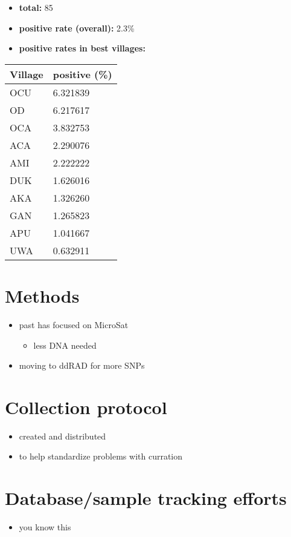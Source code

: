\documentclass[letterpaper]{scrartcl}
\begin{document}
\begin{itemize}
\itemsep1pt\parskip0pt
\item
  \textbf{total:} 85
\item
  \textbf{positive rate (overall):} 2.3\%
\item
  \textbf{positive rates in best villages:}
\end{itemize}

\begin{longtable}[c]{@{}ll@{}}
\toprule
Village & positive (\%)\tabularnewline
\midrule
\endhead
OCU & 6.321839\tabularnewline
OD & 6.217617\tabularnewline
OCA & 3.832753\tabularnewline
ACA & 2.290076\tabularnewline
AMI & 2.222222\tabularnewline
DUK & 1.626016\tabularnewline
AKA & 1.326260\tabularnewline
GAN & 1.265823\tabularnewline
APU & 1.041667\tabularnewline
UWA & 0.632911\tabularnewline
\bottomrule
\end{longtable}

\section{Methods}\label{methods}

\begin{itemize}
\itemsep1pt\parskip0pt
\item
  past has focused on MicroSat

  \begin{itemize}
  \itemsep1pt\parskip0pt
  \item
    less DNA needed
  \end{itemize}
\item
  moving to ddRAD for more SNPs
\end{itemize}

\section{Collection protocol}\label{collection-protocol}

\begin{itemize}
\itemsep1pt\parskip0pt
\item
  created and distributed
\item
  to help standardize problems with curration
\end{itemize}

\section{Database/sample tracking
efforts}\label{databasesample-tracking-efforts}

\begin{itemize}
\itemsep1pt\parskip0pt
\item
  you know this
\end{itemize}
\end{document}
